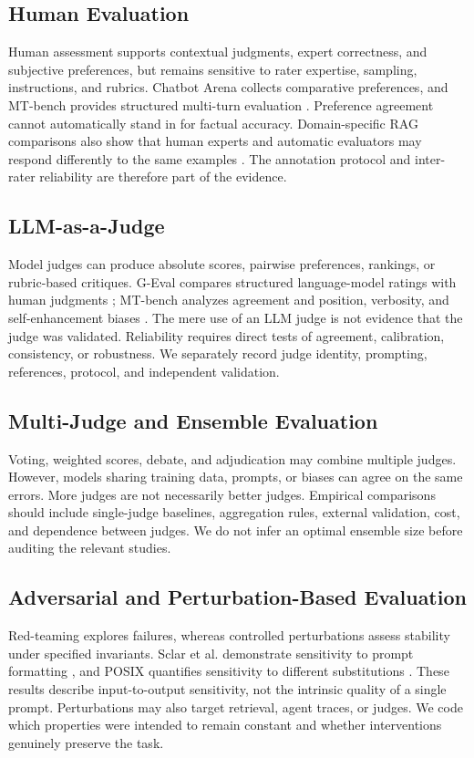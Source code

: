 \subsection{Human Evaluation}
Human assessment supports contextual judgments, expert correctness, and subjective preferences, but remains sensitive to rater expertise, sampling, instructions, and rubrics. Chatbot Arena collects comparative preferences, and MT-bench provides structured multi-turn evaluation \cite{zheng2023mtbench}. Preference agreement cannot automatically stand in for factual accuracy. Domain-specific RAG comparisons also show that human experts and automatic evaluators may respond differently to the same examples \cite{cho2026graphene}. The annotation protocol and inter-rater reliability are therefore part of the evidence.

\subsection{LLM-as-a-Judge}
Model judges can produce absolute scores, pairwise preferences, rankings, or rubric-based critiques. G-Eval compares structured language-model ratings with human judgments \cite{liu2023geval}; MT-bench analyzes agreement and position, verbosity, and self-enhancement biases \cite{zheng2023mtbench}. The mere use of an LLM judge is not evidence that the judge was validated. Reliability requires direct tests of agreement, calibration, consistency, or robustness. We separately record judge identity, prompting, references, protocol, and independent validation.

\subsection{Multi-Judge and Ensemble Evaluation}
Voting, weighted scores, debate, and adjudication may combine multiple judges. However, models sharing training data, prompts, or biases can agree on the same errors. More judges are not necessarily better judges. Empirical comparisons should include single-judge baselines, aggregation rules, external validation, cost, and dependence between judges. We do not infer an optimal ensemble size before auditing the relevant studies.

\subsection{Adversarial and Perturbation-Based Evaluation}
Red-teaming explores failures, whereas controlled perturbations assess stability under specified invariants. Sclar et al. demonstrate sensitivity to prompt formatting \cite{sclar2024formatting}, and POSIX quantifies sensitivity to different substitutions \cite{chatterjee2024posix}. These results describe input-to-output sensitivity, not the intrinsic quality of a single prompt. Perturbations may also target retrieval, agent traces, or judges. We code which properties were intended to remain constant and whether interventions genuinely preserve the task.

